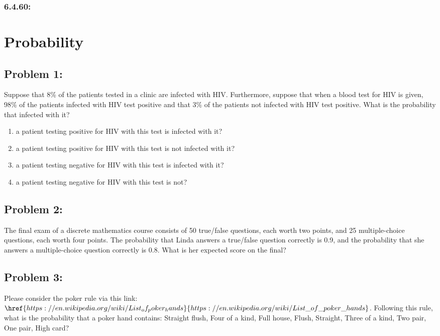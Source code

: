 \documentclass[12pt,en,a4paper]{article}
\begin{document}
	\subsubsection*{6.4.60:}
	
	\newpage
	\section*{Probability}
	\subsection*{Problem 1:}
	Suppose that 8\% of the patients tested in a clinic are infected with HIV. Furthermore, suppose that when a blood test for HIV is given, 98\% of the patients infected with HIV test positive and that 3\% of the patients not infected with HIV test positive. What is the probability that infected with it?
	\begin{enumerate}
		\item a patient testing positive for HIV with this test is infected with it?
		\item a patient testing positive for HIV with this test is not infected with it?
		\item a patient testing negative for HIV with this test is infected with it?
		\item a patient testing negative for HIV with this test is not?
	\end{enumerate}
	
	\subsection*{Problem 2:}
	The final exam of a discrete mathematics course consists of 50 true/false questions, each worth two points, and 25 multiple-choice questions, each worth four points. The probability that Linda answers a true/false question correctly is 0.9, and the probability that she answers a multiple-choice question correctly is 0.8. What is her expected score on the final?
	
	\subsection*{Problem 3:}
	Please consider the poker rule via this link: $\href{https://en.wikipedia.org/wiki/List_of_poker_hands}{https://en.wikipedia.org/wiki/List\_of\_poker\_hands}$. Following this rule, what is the probability that a poker hand contains: Straight flush, Four of a kind, Full house, Flush, Straight, Three of a kind, Two pair, One pair, High card?
	
\end{document}
